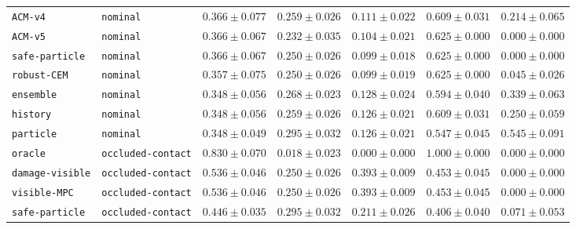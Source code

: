 \documentclass{article}
\begin{document}
\begin{center}
\begin{tabular}{llccccc}
\texttt{ACM-v4} & \texttt{nominal} & $0.366 \pm 0.077$ & $0.259 \pm 0.026$ & $0.111 \pm 0.022$ & $0.609 \pm 0.031$ & $0.214 \pm 0.065$ \\
\texttt{ACM-v5} & \texttt{nominal} & $0.366 \pm 0.067$ & $0.232 \pm 0.035$ & $0.104 \pm 0.021$ & $0.625 \pm 0.000$ & $0.000 \pm 0.000$ \\
\texttt{safe-particle} & \texttt{nominal} & $0.366 \pm 0.067$ & $0.250 \pm 0.026$ & $0.099 \pm 0.018$ & $0.625 \pm 0.000$ & $0.000 \pm 0.000$ \\
\texttt{robust-CEM} & \texttt{nominal} & $0.357 \pm 0.075$ & $0.250 \pm 0.026$ & $0.099 \pm 0.019$ & $0.625 \pm 0.000$ & $0.045 \pm 0.026$ \\
\texttt{ensemble} & \texttt{nominal} & $0.348 \pm 0.056$ & $0.268 \pm 0.023$ & $0.128 \pm 0.024$ & $0.594 \pm 0.040$ & $0.339 \pm 0.063$ \\
\texttt{history} & \texttt{nominal} & $0.348 \pm 0.056$ & $0.259 \pm 0.026$ & $0.126 \pm 0.021$ & $0.609 \pm 0.031$ & $0.250 \pm 0.059$ \\
\texttt{particle} & \texttt{nominal} & $0.348 \pm 0.049$ & $0.295 \pm 0.032$ & $0.126 \pm 0.021$ & $0.547 \pm 0.045$ & $0.545 \pm 0.091$ \\
\texttt{oracle} & \texttt{occluded-contact} & $0.830 \pm 0.070$ & $0.018 \pm 0.023$ & $0.000 \pm 0.000$ & $1.000 \pm 0.000$ & $0.000 \pm 0.000$ \\
\texttt{damage-visible} & \texttt{occluded-contact} & $0.536 \pm 0.046$ & $0.250 \pm 0.026$ & $0.393 \pm 0.009$ & $0.453 \pm 0.045$ & $0.000 \pm 0.000$ \\
\texttt{visible-MPC} & \texttt{occluded-contact} & $0.536 \pm 0.046$ & $0.250 \pm 0.026$ & $0.393 \pm 0.009$ & $0.453 \pm 0.045$ & $0.000 \pm 0.000$ \\
\texttt{safe-particle} & \texttt{occluded-contact} & $0.446 \pm 0.035$ & $0.295 \pm 0.032$ & $0.211 \pm 0.026$ & $0.406 \pm 0.040$ & $0.071 \pm 0.053$ \\
\bottomrule
\end{tabular}
\end{center}
\end{document}
